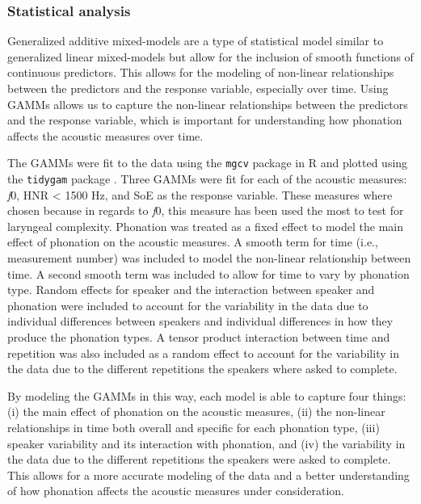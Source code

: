 \subsubsection{Statistical analysis} \label{sec:statistical_analysis}

Generalized additive mixed-models \citep[GAMM;][]{hastieGeneralizedAdditiveModels1986,woodGeneralizedAdditiveModels2017} are a type of statistical model similar to generalized linear mixed-models but allow for the inclusion of smooth functions of continuous predictors. This allows for the modeling of non-linear relationships between the predictors and the response variable, especially over time. Using GAMMs allows us to capture the non-linear relationships between the predictors and the response variable, which is important for understanding how phonation affects the acoustic measures over time. 

The GAMMs were fit to the data using the \texttt{mgcv} package in R \citep{woodGeneralizedAdditiveModels2017} and plotted using the \texttt{tidygam} package \citep{corettaTidygamTidyPrediction2024}. Three GAMMs were fit for each of the acoustic measures: \textit{f}0, HNR < 1500 Hz, and SoE as the response variable. These measures where chosen because in regards to \textit{f}0, this measure has been used the most to test for laryngeal complexity. Phonation was treated as a fixed effect to model the main effect of phonation on the acoustic measures. A smooth term for time (i.e., measurement number)  was included to model the non-linear relationship between time. A second smooth term was included to allow for time to vary by phonation type. Random effects for speaker and the interaction between speaker and phonation were included to account for the variability in the data due to individual differences between speakers and individual differences in how they produce the phonation types. A tensor product interaction between time and repetition was also included as a random effect to account for the variability in the data due to the different repetitions the speakers where asked to complete. 

By modeling the GAMMs in this way, each model is able to capture four things: (i) the main effect of phonation on the acoustic measures, (ii) the non-linear relationships in time both overall and specific for each phonation type, (iii) speaker variability and its interaction with phonation, and (iv) the variability in the data due to the different repetitions the speakers were asked to complete. This allows for a more accurate modeling of the data and a better understanding of how phonation affects the acoustic measures under consideration. 

